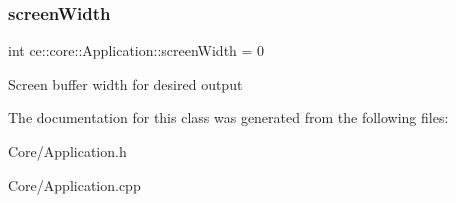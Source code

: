 \subsubsection{\texorpdfstring{screen\+Width}{screenWidth}}
{\footnotesize\ttfamily int ce\+::core\+::\+Application\+::screen\+Width = 0}

Screen buffer width for desired output 

The documentation for this class was generated from the following files\+:\begin{DoxyCompactItemize}
\item 
Core/Application.\+h\item 
Core/Application.\+cpp\end{DoxyCompactItemize}
